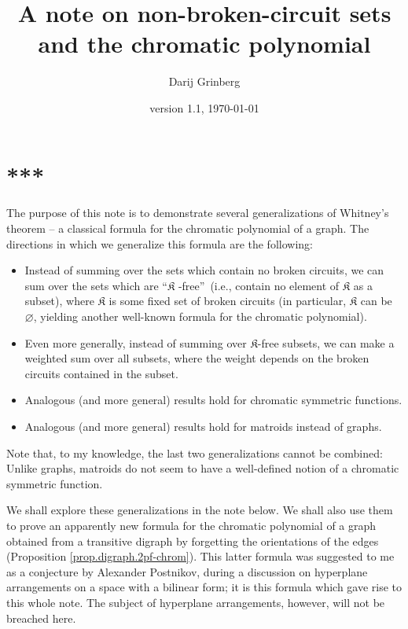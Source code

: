 \documentclass[numbers=enddot,12pt,final,onecolumn,notitlepage]{scrartcl}%
\theoremstyle{definition}
\begin{document}
\title{A note on non-broken-circuit sets and the chromatic polynomial}
\author{Darij Grinberg}
\date{version 1.1, \today}
\maketitle
\tableofcontents

\section*{***}

The purpose of this note is to demonstrate several generalizations of
Whitney's theorem \cite{BlaSag86} -- a classical formula for the chromatic
polynomial of a graph. The directions in which we generalize this formula are
the following:

\begin{itemize}
\item Instead of summing over the sets which contain no broken circuits, we
can sum over the sets which are \textquotedblleft$\mathfrak{K}$%
-free\textquotedblright\ (i.e., contain no element of $\mathfrak{K}$ as a
subset), where $\mathfrak{K}$ is some fixed set of broken circuits (in
particular, $\mathfrak{K}$ can be $\varnothing$, yielding another well-known
formula for the chromatic polynomial).

\item Even more generally, instead of summing over $\mathfrak{K}$-free
subsets, we can make a weighted sum over all subsets, where the weight depends
on the broken circuits contained in the subset.

\item Analogous (and more general) results hold for chromatic symmetric functions.

\item Analogous (and more general) results hold for matroids instead of graphs.
\end{itemize}

Note that, to my knowledge, the last two generalizations cannot be combined:
Unlike graphs, matroids do not seem to have a well-defined notion of a
chromatic symmetric function.

We shall explore these generalizations in the note below. We shall also use
them to prove an apparently new formula for the chromatic polynomial of a
graph obtained from a transitive digraph by forgetting the orientations of the
edges (Proposition \ref{prop.digraph.2pf-chrom}). This latter formula was
suggested to me as a conjecture by Alexander Postnikov, during a discussion on
hyperplane arrangements on a space with a bilinear form; it is this formula
which gave rise to this whole note. The subject of hyperplane arrangements,
however, will not be breached here.
\end{document}
